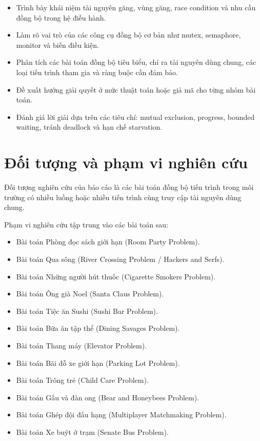 \begin{itemize}
    \item Trình bày khái niệm tài nguyên găng, vùng găng, race condition và nhu cầu đồng bộ trong hệ điều hành.
    \item Làm rõ vai trò của các công cụ đồng bộ cơ bản như mutex, semaphore, monitor và biến điều kiện.
    \item Phân tích các bài toán đồng bộ tiêu biểu, chỉ ra tài nguyên dùng chung, các loại tiến trình tham gia và ràng buộc cần đảm bảo.
    \item Đề xuất hướng giải quyết ở mức thuật toán hoặc giả mã cho từng nhóm bài toán.
    \item Đánh giá lời giải dựa trên các tiêu chí: mutual exclusion, progress, bounded waiting, tránh deadlock và hạn chế starvation.
\end{itemize}

\section{Đối tượng và phạm vi nghiên cứu}

Đối tượng nghiên cứu của báo cáo là các bài toán đồng bộ tiến trình trong môi trường có nhiều luồng hoặc nhiều tiến trình cùng truy cập tài nguyên dùng chung.

Phạm vi nghiên cứu tập trung vào các bài toán sau:

\begin{itemize}
    \item Bài toán Phòng đọc sách giới hạn (Room Party Problem).
    \item Bài toán Qua sông (River Crossing Problem / Hackers and Serfs).
    \item Bài toán Những người hút thuốc (Cigarette Smokers Problem).
    \item Bài toán Ông già Noel (Santa Claus Problem).
    \item Bài toán Tiệc ăn Sushi (Sushi Bar Problem).
    \item Bài toán Bữa ăn tập thể (Dining Savages Problem).
    \item Bài toán Thang máy (Elevator Problem).
    \item Bài toán Bãi đỗ xe giới hạn (Parking Lot Problem).
    \item Bài toán Trông trẻ (Child Care Problem).
    \item Bài toán Gấu và đàn ong (Bear and Honeybees Problem).
    \item Bài toán Ghép đội đấu hạng (Multiplayer Matchmaking Problem).
    \item Bài toán Xe buýt ở trạm (Senate Bus Problem).
\end{itemize}

